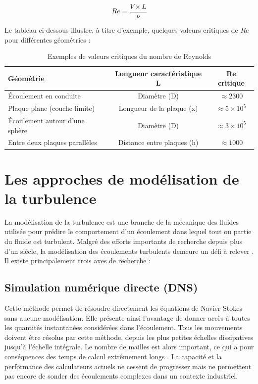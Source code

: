 \begin{equation}
Re = \frac{V \times L}{\nu}
\label{eq:reynolds}
\end{equation}

Le tableau ci-dessous illustre, à titre d'exemple, quelques valeurs critiques de $Re$ pour différentes géométries :

\begin{table}[H]
    \centering
    \caption{Exemples de valeurs critiques du nombre de Reynolds}
    \label{tab:reynolds_critique}
    \begin{tabular}{|l|c|c|}
        \hline
        \textbf{Géométrie} & \textbf{Longueur caractéristique L} & \textbf{Re critique} \\
        \hline
        Écoulement en conduite & Diamètre (D) & $\approx 2300$ \\
        \hline
        Plaque plane (couche limite) & Longueur de la plaque (x) & $\approx 5\times10^5$ \\
        \hline
        Écoulement autour d'une sphère & Diamètre (D) & $\approx 3\times10^5$ \\
        \hline
        Entre deux plaques parallèles & Distance entre plaques (h) & $\approx 1000$ \\
        \hline
    \end{tabular}
\end{table}

\section{Les approches de modélisation de la turbulence}
\label{sec:approches_turbulence}

La modélisation de la turbulence est une branche de la mécanique des fluides utilisée pour prédire le comportement d'un écoulement dans lequel tout ou partie du fluide est turbulent. Malgré des efforts importants de recherche depuis plus d'un siècle, la modélisation des écoulements turbulents demeure un défi à relever \cite{wilcox2006turbulence}. Il existe principalement trois axes de recherche : \cite{sagaut2006large}

\subsection{Simulation numérique directe (DNS)}
\label{subsec:dns}

Cette méthode permet de résoudre directement les équations de Navier-Stokes sans aucune modélisation. Elle présente ainsi l'avantage de donner accès à toutes les quantités instantanées considérées dans l'écoulement. Tous les mouvements doivent être résolus par cette méthode, depuis les plus petites échelles dissipatives jusqu'à l'échelle intégrale. Le nombre de mailles est alors important, ce qui a pour conséquences des temps de calcul extrêmement longs \cite{moin1998direct}. La capacité et la performance des calculateurs actuels ne cessent de progresser mais ne permettent pas encore de sonder des écoulements complexes dans un contexte industriel.

